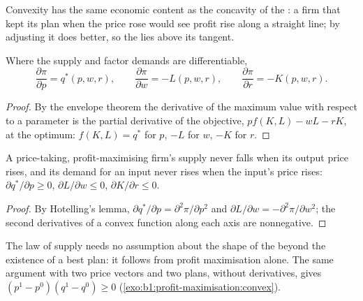 Convexity has the same economic content as the concavity of the : a firm that kept its plan when the price rose would see profit
rise along a straight line; by adjusting it does better, so the  lies above its tangent.

\begin{theorem}\label{thm:b1:profit-maximisation:hotelling}
Where the supply and factor demands are differentiable,
\[
\frac{\partial\pi}{\partial p} = q^*(p, w, r),\qquad \frac{\partial\pi}{\partial w} = -L(p, w, r),\qquad
\frac{\partial\pi}{\partial r} = -K(p, w, r).
\]
\end{theorem}

\begin{proof}
By the envelope theorem the derivative of the maximum value with respect to
a parameter is the partial derivative of the objective,
$pf(K, L) - wL - rK$, at the optimum: $f(K, L) = q^*$ for $p$, $-L$ for $w$, $-K$
for $r$.
\end{proof}

\begin{proposition}\label{prop:b1:profit-maximisation:law-of-supply}
A price-taking, profit-maximising firm's supply never falls when its
output price rises, and its demand for an input never rises when the
input's price rises: $\partial q^*/\partial p \ge 0$, $\partial L/\partial w \le 0$, $\partial K/\partial r \le 0$.
\end{proposition}

\begin{proof}
By Hotelling's lemma, $\partial q^*/\partial p = \partial^2\pi/\partial p^2$ and
$\partial L/\partial w = -\partial^2\pi/\partial w^2$; the second derivatives of a convex function
along each axis are nonnegative.
\end{proof}

The law of supply needs no assumption about the shape of the  beyond the existence of a best plan: it follows from profit
maximisation alone. The same argument with two price vectors and two
plans, without derivatives, gives $(p^1 - p^0)(q^1 - q^0) \ge 0$
(\cref{exo:b1:profit-maximisation:convex}).

